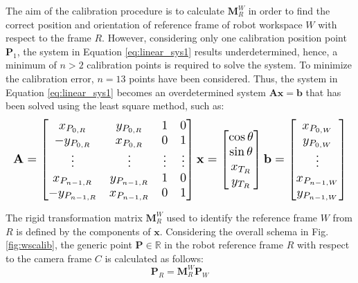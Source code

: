 \documentclass[a4paper, 10pt, conference]{ieeeconf}      %
\begin{document}
The aim of the calibration procedure is to calculate $\mathbf{M}^W_{R}$ in order to find the correct position and orientation of reference frame of robot workspace $W$ with respect to the frame $R$. However, considering only one calibration position point $\mathbf{P}_1$, the system in Equation \ref{eq:linear_sys1} results underdetermined, hence, a minimum of $n>2$ calibration points is required to solve the system. To minimize the calibration error, $n=13$ points have been considered. Thus, the system in Equation \ref{eq:linear_sys1} becomes an overdetermined system $\mathbf{A}\mathbf{x}=\mathbf{b}$ that has been solved using the least square method, such as:
\begin{equation}\label{eq:linear_sys2}
\resizebox{\columnwidth}{!}{$%
	\begin{gathered}
	\mathbf{A} =   \begin{bmatrix}
	x_{P_{0,R}} & y_{P_{0,R}} & 1 & 0\\
	-y_{P_{0,R}} & x_{P_{0,R}} & 0 & 1 \\
	\vdots & \vdots & \vdots & \vdots\\
	x_{P_{n-1,R}} & y_{P_{n-1,R}} & 1 & 0\\
	-y_{P_{n-1,R}} & x_{P_{n-1,R}} & 0 & 1 
	\end{bmatrix}
	\mathbf{x} =   \begin{bmatrix}
	\cos\theta\\
	\sin\theta\\
	x_{T_R}\\
	y_{T_R}
	\end{bmatrix}
	\mathbf{b} =   \begin{bmatrix}
	x_{P_{0,W}}\\
	y_{P_{0,W}}\\
	\vdots\\
	x_{P_{n-1,W}}\\
	y_{P_{n-1,W}}\\
	\end{bmatrix}
	\end{gathered}
	$%
}%
\end{equation}

The rigid transformation matrix $\mathbf{M}^W_{R}$ used to identify the reference frame $W$ from $R$ is defined by the components of $\mathbf{x}$.
Considering the overall schema in Fig. \ref{fig:wscalib}, the generic point $\mathbf{P}\in\mathbb{R}$ in the robot reference frame $R$ with respect to the camera frame $C$ is calculated as follows:
\begin{equation}\label{eq:roto1}
\mathbf{P}_{R} = \mathbf{M}^W_{R}\mathbf{P}_{W}
\end{equation}
\end{document}
